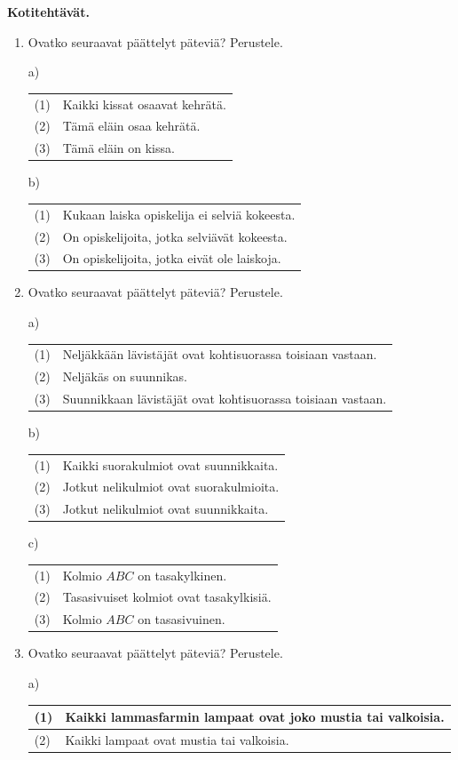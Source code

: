 {\bf Kotitehtävät.}
\begin{enumerate}
\item Ovatko seuraavat päättelyt päteviä? Perustele.

a)
\begin{tabular}{ll}
 (1) & Kaikki kissat osaavat kehrätä.\\
 (2) & Tämä eläin osaa kehrätä. \\ \hline
 (3) & Tämä eläin on kissa.
\end{tabular}

b)
\begin{tabular}{ll}
(1) &  Kukaan laiska opiskelija ei selviä kokeesta.\\
(2) & On opiskelijoita, jotka selviävät kokeesta. \\ \hline
(3) & On opiskelijoita, jotka eivät ole laiskoja.
\end{tabular}


\item Ovatko seuraavat päättelyt päteviä? Perustele.

a)
\begin{tabular}{ll}
(1) & Neljäkkään lävistäjät ovat kohtisuorassa toisiaan vastaan.\\
(2) & Neljäkäs on suunnikas.\\ \hline
(3) & Suunnikkaan lävistäjät ovat kohtisuorassa toisiaan vastaan.
\end{tabular}

b)
\begin{tabular}{ll}
(1) & Kaikki suorakulmiot ovat suunnikkaita.\\
(2) & Jotkut nelikulmiot ovat suorakulmioita.\\ \hline
(3) & Jotkut nelikulmiot ovat suunnikkaita. 
\end{tabular}

c) 
\begin{tabular}{ll}
(1) & Kolmio $ABC$ on tasakylkinen.\\
(2) & Tasasivuiset kolmiot ovat tasakylkisiä.\\ \hline
(3) & Kolmio $ABC$ on tasasivuinen.
\end{tabular}


\item Ovatko seuraavat päättelyt päteviä? Perustele.

a)
\begin{tabular}{ll}
(1) & Kaikki lammasfarmin lampaat ovat joko mustia tai valkoisia. \\ \hline
(2) & Kaikki lampaat ovat mustia tai valkoisia.
\end{tabular}


\end{enumerate}
